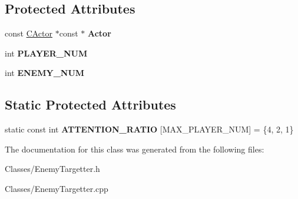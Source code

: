 \subsection*{Protected Attributes}
\begin{DoxyCompactItemize}
\item 
const \hyperlink{class_c_actor}{C\+Actor} $\ast$const $\ast$ {\bfseries Actor}\hypertarget{class_c_enemy_targetter_a0a9807c1bae91f90e2648e25905f70a8}{}\label{class_c_enemy_targetter_a0a9807c1bae91f90e2648e25905f70a8}

\item 
int {\bfseries P\+L\+A\+Y\+E\+R\+\_\+\+N\+UM}\hypertarget{class_c_enemy_targetter_abba63cf970c8452e637a5666c84795de}{}\label{class_c_enemy_targetter_abba63cf970c8452e637a5666c84795de}

\item 
int {\bfseries E\+N\+E\+M\+Y\+\_\+\+N\+UM}\hypertarget{class_c_enemy_targetter_ab53b98698c5e32c78c58cf2bc070316c}{}\label{class_c_enemy_targetter_ab53b98698c5e32c78c58cf2bc070316c}

\end{DoxyCompactItemize}
\subsection*{Static Protected Attributes}
\begin{DoxyCompactItemize}
\item 
static const int {\bfseries A\+T\+T\+E\+N\+T\+I\+O\+N\+\_\+\+R\+A\+T\+IO} \mbox{[}M\+A\+X\+\_\+\+P\+L\+A\+Y\+E\+R\+\_\+\+N\+UM\mbox{]} = \{4, 2, 1\}\hypertarget{class_c_enemy_targetter_a7b84c79982d75a00756e6f01ef56743b}{}\label{class_c_enemy_targetter_a7b84c79982d75a00756e6f01ef56743b}

\end{DoxyCompactItemize}


The documentation for this class was generated from the following files\+:\begin{DoxyCompactItemize}
\item 
Classes/Enemy\+Targetter.\+h\item 
Classes/Enemy\+Targetter.\+cpp\end{DoxyCompactItemize}
